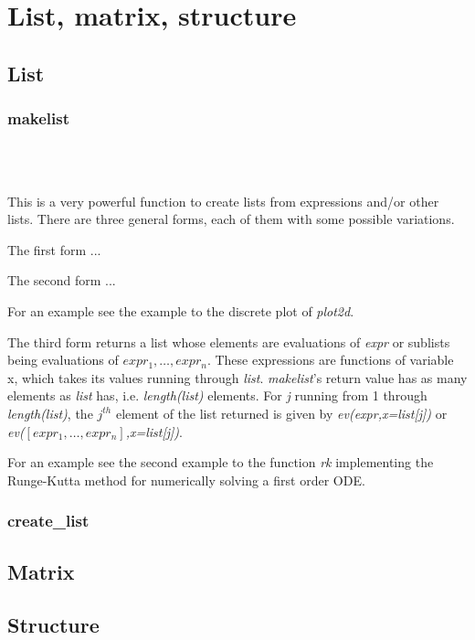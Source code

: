 \documentclass[../Maxima_Workbook.tex]{subfiles}
\begin{document}
	
\chapter{List, matrix, structure}

\section{List}\label{DS1}

\subsection{makelist}

\lz {} \hfill \tcr{[function]} \\
 \\

\lz This is a very powerful function to create lists from expressions and/or other lists. There are three general forms, each of them with some possible variations.

\lz The first form ...

\lz The second form ...

\lz For an example see the example to the discrete plot of \emph{plot2d}.

\lz The third form returns a list whose elements are evaluations of \emph{expr} or sublists being evaluations of $ expr_1,\dots,expr_n $. These expressions are functions of variable x, which takes its values running through \emph{list}. \emph{makelist}'s return value has as many elements as \emph{list} has, i.e. \emph{length(list)} elements. For \emph{j} running from 1 through \emph{length(list)}, the $ j^{th} $ element of the list returned is given by \emph{ev(expr,x=list[j])} or \emph{ev($ [expr_1,\dots,expr_n] $,x=list[j])}. 

\lz For an example see the second example to the function \emph{rk} implementing the Runge-Kutta method for numerically solving a first order ODE.

\subsection{create\_list}

\section{Matrix}


\section{Structure}
\end{document}
